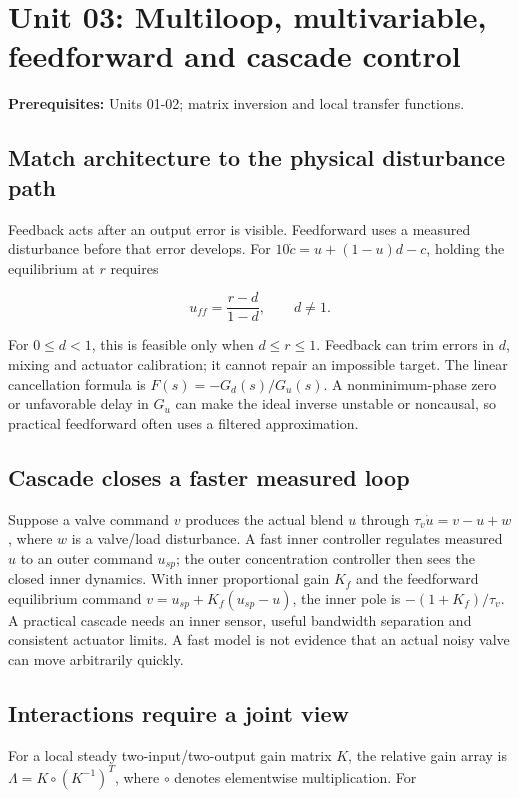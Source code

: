 \documentclass[11pt,a4paper]{article}
\begin{document}
\clearpage\section{Unit 03: Multiloop, multivariable, feedforward and cascade control}
\textbf{Prerequisites:} Units 01-02; matrix inversion and local transfer functions.


\subsection{Match architecture to the physical disturbance path}

Feedback acts after an output error is visible. Feedforward uses a measured disturbance before that error develops. For $10\dot c=u+(1-u)d-c$, holding the equilibrium at $r$ requires


\[u_{ff}=\frac{r-d}{1-d},\qquad d\ne1.\]

For $0\leq d<1$, this is feasible only when $d\leq r\leq1$. Feedback can trim errors in $d$, mixing and actuator calibration; it cannot repair an impossible target. The linear cancellation formula is $F(s)=-G_d(s)/G_u(s)$. A nonminimum-phase zero or unfavorable delay in $G_u$ can make the ideal inverse unstable or noncausal, so practical feedforward often uses a filtered approximation.


\subsection{Cascade closes a faster measured loop}

Suppose a valve command $v$ produces the actual blend $u$ through $\tau_v\dot u=v-u+w$, where $w$ is a valve/load disturbance. A fast inner controller regulates measured $u$ to an outer command $u_{sp}$; the outer concentration controller then sees the closed inner dynamics. With inner proportional gain $K_f$ and the feedforward equilibrium command $v=u_{sp}+K_f(u_{sp}-u)$, the inner pole is $-(1+K_f)/\tau_v$. A practical cascade needs an inner sensor, useful bandwidth separation and consistent actuator limits. A fast model is not evidence that an actual noisy valve can move arbitrarily quickly.


\subsection{Interactions require a joint view}

For a local steady two-input/two-output gain matrix $K$, the relative gain array is $\Lambda=K\circ(K^{-1})^T$, where $\circ$ denotes elementwise multiplication. For
\end{document}

